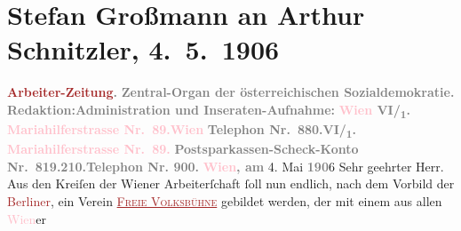 

               \section[Stefan Großmann an Arthur Schnitzler, 4. 5. 1906]{ Stefan Großmann an Arthur Schnitzler, 4. 5. 1906}\nopagebreak{}\rehead{ }\normalsize\beginnumbering{} \toendnotes[C]{\smallbreak\pagebreak[2]} 
\pstart
           \noindent{}\centering{}{\pb}\textcolor{gray}{\textbf{\textcolor{brown}{Arbeiter-Zeitung}{}\ledrightnote{\textcolor{brown}{Arbeiter-Zeitung}}.}}\pend
           \pstart
           \noindent{}\centering{}\textcolor{gray}{\textbf{Zentral-Organ der österreichischen Sozialdemokratie.}}\pend
           \pstart
           \noindent{}\textcolor{gray}{\textbf{Redaktion:}}\hfill \textcolor{gray}{\textbf{Administration und Inseraten-Aufnahme:}}\pend
           \pstart
           \textcolor{gray}{\textbf{\textcolor{pink}{Wien}{}\ledrightnote{\textcolor{pink}{Wien}} VI/\textsubscript{1}. \textcolor{pink}{Mariahilferstrasse Nr. 89.}{}\ledrightnote{\textcolor{pink}{Mariahilferstraße}}}}\hfill \textcolor{gray}{\textbf{\textcolor{pink}{Wien}{}\ledrightnote{\textcolor{pink}{Wien}}}}\pend
           \pstart
           \textcolor{gray}{\textbf{Telephon Nr. 880.}}\hfill \textcolor{gray}{\textbf{VI/\textsubscript{1}. \textcolor{pink}{Mariahilferstrasse
                           Nr. 89.}{}\ledrightnote{\textcolor{pink}{Mariahilferstraße}}}}\pend
           \pstart
           \textcolor{gray}{\textbf{Postsparkassen-Scheck-Konto Nr. 819.210.}}\hfill \textcolor{gray}{\textbf{Telephon Nr. 900.}}\pend
           \pstart
           \raggedleft{}\textcolor{gray}{\textbf{\textcolor{pink}{Wien}{}\ledrightnote{\textcolor{pink}{Wien}}, am}}{ }4. Mai \textcolor{gray}{\textbf{190}}6\pend
           \pstart{}Sehr geehrter Herr.\pend\pstart
           Aus den Kreiſen der Wiener Arbeiterſchaft ſoll nun endlich, nach dem Vorbild der \textcolor{brown}{Berliner}{}\ledrightnote{\textcolor{brown}{Volksbühne Berlin}}, ein Verein \textcolor{brown}{\textsc{\uline{Freie Volksbühne}}}{}\ledrightnote{\textcolor{brown}{Wiener Freie Volksbühne}} gebildet werden, der mit einem aus allen \textcolor{pink}{Wien}{}\ledrightnote{\textcolor{pink}{Wien}}er
